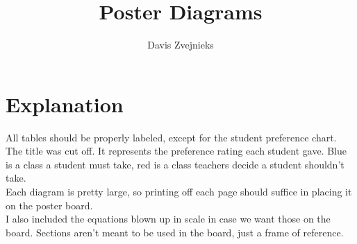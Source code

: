 \documentclass[11pt]{article}
\title{\textbf{Poster Diagrams}}
\author{Davis Zvejnieks}
\date{}
\begin{document}
\maketitle
\section{Explanation}
All tables should be properly labeled, except for the student preference chart. The title was cut off. It represents the preference rating each student gave. Blue is a class a student must take, red is a class teachers decide a student shouldn't take.\\
\indent Each diagram is pretty large, so printing off each page should suffice in placing it on the poster board.\\
\indent I also included the equations blown up in scale in case we want those on the board. Sections aren't meant to be used in the board, just a frame of reference.
\end{document}
